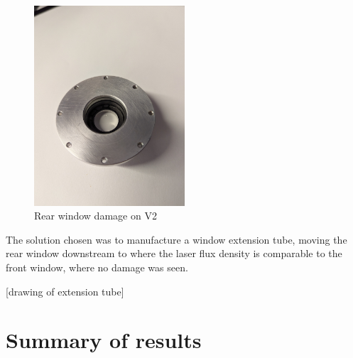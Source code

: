             \begin{figure}[!ht]
                \centering
                \includegraphics[width=0.5\textwidth]{assets/4 experiments/window damage.jpg}
                \caption{Rear window damage on V2}
            \end{figure}

            The solution chosen was to manufacture a window extension tube, moving the rear window downstream to where the laser flux density is comparable to the front window, where no damage was seen.

            [drawing of extension tube]


        




        \section{Summary of results}

